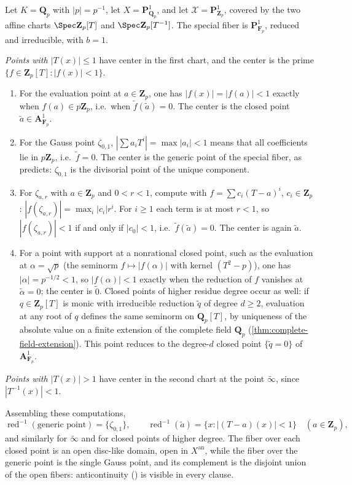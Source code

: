 \begin{example}
\label{ex:berk-reduction-p1-qp}
Let $K=\mathbf Q_p$ with $|p|=p^{-1}$, let
$X=\mathbf P^1_{\mathbf Q_p}$, and let
$\mathcal X=\mathbf P^1_{\mathbf Z_p}$, covered by the two affine
charts $\Spec\mathbf Z_p[T]$ and $\Spec\mathbf Z_p[T^{-1}]$.  The
special fiber is $\mathbf P^1_{\mathbf F_p}$, reduced and irreducible,
with $b=1$.

\emph{Points with $|T(x)|\leq1$} have center in the first chart, and
the center is the prime $\{f\in\mathbf Z_p[T]:|f(x)|<1\}$.
\begin{enumerate}
\item For the evaluation point at $a\in\mathbf Z_p$, one has
  $|f(x)|=|f(a)|<1$ exactly when $f(a)\in p\mathbf Z_p$, i.e.\ when
  $\tilde f(\tilde a)=0$.  The center is the closed point
  $\tilde a\in\mathbf A^1_{\mathbf F_p}$.
\item For the Gauss point $\zeta_{0,1}$,
  $|\sum a_iT^i|=\max|a_i|<1$ means that all coefficients lie in
  $p\mathbf Z_p$, i.e.\ $\tilde f=0$.  The center is the generic
  point of the special fiber, as
   predicts: $\zeta_{0,1}$ is the
  divisorial point of the unique component.
\item For $\zeta_{a,r}$ with $a\in\mathbf Z_p$ and $0<r<1$,
  compute with $f=\sum c_i(T-a)^i$, $c_i\in\mathbf Z_p$:
  $|f(\zeta_{a,r})|=\max_i|c_i|r^i$.  For $i\ge1$ each term is at
  most $r<1$, so $|f(\zeta_{a,r})|<1$ if and only if $|c_0|<1$,
  i.e.\ $\tilde f(\tilde a)=0$.  The center is again $\tilde a$.
\item For a point with support at a nonrational closed point, such as the
  evaluation at $\alpha=\sqrt p$ (the seminorm
  $f\mapsto|f(\alpha)|$ with kernel $(T^2-p)$), one has
  $|\alpha|=p^{-1/2}<1$, so $|f(\alpha)|<1$ exactly when the reduction
  of $f$ vanishes at $\tilde\alpha=0$; the center is
  $\tilde 0$.  Closed points of higher residue degree occur as well:
  if $q\in\mathbf Z_p[T]$ is monic with irreducible reduction
  $\tilde q$ of degree $d\ge2$, evaluation at any root of $q$ defines
  the same seminorm on $\mathbf Q_p[T]$, by uniqueness of the absolute
  value on a finite extension of the complete field $\mathbf Q_p$
  (\cref{thm:complete-field-extension}). This point reduces to the
  degree-$d$ closed point $\{\tilde q=0\}$ of
  $\mathbf A^1_{\mathbf F_p}$.
\end{enumerate}
\emph{Points with $|T(x)|>1$} have center in the second chart at the
point $\widetilde\infty$, since $|T^{-1}(x)|<1$.

Assembling these computations,
\[
 \operatorname{red}^{-1}(\text{generic point})=\{\zeta_{0,1}\},
 \qquad
 \operatorname{red}^{-1}(\tilde a)
 =\{x:|(T-a)(x)|<1\}
 \quad(a\in\mathbf Z_p),
\]
and similarly for $\widetilde\infty$ and for closed points of higher
degree.  The fiber over each closed point is an open disc-like domain,
open in $X^{\mathrm{an}}$, while the fiber over the generic point is the
single Gauss point, and its complement is the disjoint union of the open
fibers: anticontinuity () is
visible in every clause.
\end{example}

